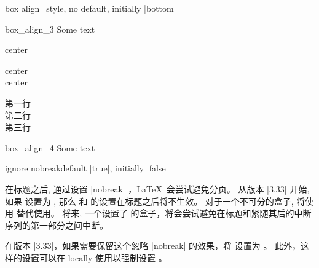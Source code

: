\begin{docTcbKey}[][doc new=2014-10-10]{box align}{=}{style, no default, initially |bottom|}
\begin{exdispExample}{box_align_3}
Some text\dotfill
\begin{tcolorbox}[box align=center]
  center
\end{tcolorbox}
\begin{tcolorbox}[box align=center]
  center\\center
\end{tcolorbox}
\begin{tcolorbox}
  第一行\\第二行\\第三行
    \end{tcolorbox}
\end{exdispExample}

\begin{exdispExample}{box_align_4}
Some text\dotfill
{}
\end{exdispExample}
\end{docTcbKey}





\begin{docTcbKey}[][doc new=2014-12-11]{ignore nobreak}{}{default |true|, initially |false|}
  
  在标题之后, 通过设置 |nobreak| ，\LaTeX\ 会尝试避免分页。
  从版本 |3.33| 开始, 如果  设置为 , 那么  和 
  的设置在标题之后将不生效。%
  对于一个不可分的盒子, 将使用  替代使用。
  将来, 一个设置了  的盒子，将会尝试避免在标题和紧随其后的中断序列的第一部分之间中断。
  
  在版本 |3.33|，如果需要保留这个忽略 |nobreak| 的效果，将  设置为 。 此外，这样的设置可以在 locally 使用以强制设置  。
  \end{docTcbKey}
  
